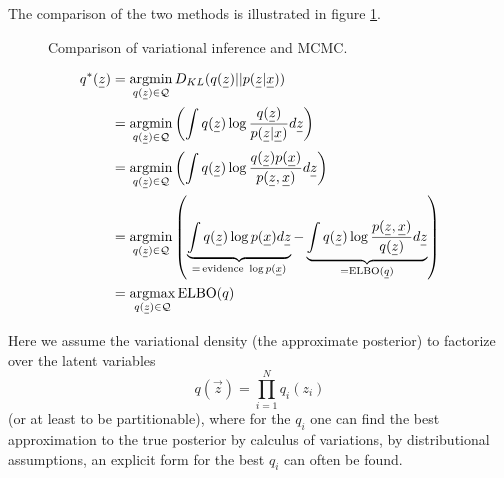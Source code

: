 
The comparison of the two methods is illustrated in figure \ref{fig:vi_mcmc}.

\begin{figure}[!htb]
    \centering
    
    \caption{Comparison of variational inference and MCMC.}
    \label{fig:vi_mcmc}
\end{figure}

\begin{equation}
    \begin{aligned}
        q^*(\vec{z}) &= \argmin_{q(\vec{z}) \in \mathcal{Q}} D_{KL}(q(\vec{z})||p(\vec{z}|\vec{x})) \\
        &= \argmin_{q(\vec{z}) \in \mathcal{Q}} \left( \int q(\vec{z}) \log \frac{q(\vec{z})}{p(\vec{z}|\vec{x})} d\vec{z} \right) \\
        &= \argmin_{q(\vec{z}) \in \mathcal{Q}} \left( \int q(\vec{z}) \log \frac{q(\vec{z}) p(\vec{x})}{p(\vec{z},\vec{x})} d\vec{z} \right) \\
        &= \argmin_{q(\vec{z}) \in \mathcal{Q}} \left( \underbrace{\int q(\vec{z}) \log p(\vec{x}) d\vec{z}}_{=\,\text{evidence } \log p(\vec{x})} - \underbrace{\int q(\vec{z}) \log \frac{p(\vec{z},\vec{x})}{q(\vec{z})} d\vec{z}}_{=\text{ELBO}(\vec{q})} \right) \\
        &= \argmax_{q(\vec{z}) \in \mathcal{Q}} \text{ELBO}(q)
    \end{aligned}
\end{equation}

Here we assume the variational density (the approximate posterior) to factorize over the latent variables
\begin{equation}
    q(\vec{z}) = \prod_{i=1}^{N} q_i(z_i)
\end{equation}
(or at least to be partitionable), where for the $q_i$ one can find
the best approximation to the true posterior by calculus of variations,
by distributional assumptions, an explicit form for the best $q_i$ can
often be found.

